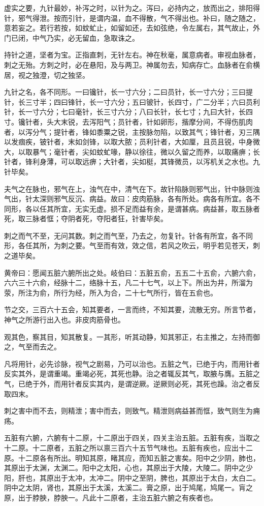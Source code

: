 \documentclass[a4paper,12pt,UTF8,twoside]{ctexbook}
\begin{document}
	虚实之要，九针最妙，补泻之时，以针为之。泻曰，必持内之，放而出之，排阳得针，邪气得泄。按而引针，是谓内温，血不得散，气不得出也。补曰，随之随之，意若妄之。若行若按，如蚊虻止，如留如还，去如弦绝，令左属右，其气故止，外门已闭，中气乃实，必无留血，急取诛之。
	
	持针之道，坚者为宝。正指直刺，无针左右。神在秋毫，属意病者。审视血脉者，刺之无殆。方刺之时，必在悬阳，及与两卫。神属勿去，知病存亡。血脉者在俞横居，视之独澄，切之独坚。
	
	九针之名，各不同形。一曰镵针，长一寸六分；二曰员针，长一寸六分；三曰提针，长三寸半；四曰锋针，长一寸六分；五曰铍针，长四寸，广二分半；六曰员利针，长一寸六分；七曰毫针，长三寸六分；八曰长针，长七寸；九曰大针，长四寸。镵针者，头大末锐，去泻阳气；员针者，针如卵形，揩摩分间，不得伤肌肉者，以泻分气；提针者，锋如黍粟之锐，主按脉勿陷，以致其气；锋针者，刃三隅以发痼疾，铍针者，末如剑锋，以取大脓；员利针者，大如厘，且员且锐，中身微大，以取暴气；毫针者，尖如蚊虻喙，静以徐往，微以久留之而养，以取痛痹；长针者，锋利身薄，可以取远痹；大针者，尖如梃，其锋微员，以泻机关之水也。九针毕矣。
	
	夫气之在脉也，邪气在上，浊气在中，清气在下。故针陷脉则邪气出，针中脉则浊气出，针太深则邪气反沉、病益。故曰：皮肉筋脉，各有所处。病各有所宜。各不同形，各以任其所宜，无实无虚。损不足而益有余，是谓甚病。病益甚，取五脉者死，取三脉者恇；夺阴者死，夺阳者狂，针害毕矣。
	
	刺之而气不至，无问其数。刺之而气至，乃去之，勿复针。针各有所宜，各不同形，各任其所，为刺之要。气至而有效，效之信，若风之吹云，明乎若见苍天，刺之道毕矣。
	
	黄帝曰：愿闻五脏六腑所出之处。岐伯曰：五脏五俞，五五二十五俞，六腑六俞，六六三十六俞，经脉十二，络脉十五，凡二十七气，以上下。所出为井，所溜为荥，所注为俞，所行为经，所入为合，二十七气所行，皆在五俞也。
	
	节之交，三百六十五会，知其要者，一言而终，不知其要，流散无穷。所言节者，神气之所游行出入也。非皮肉筋骨也。
	
	观其色，察其目，知其散复。一其形，听其动静，知其邪正，右主推之，左持而御之，气至而去之。
	
	凡将用针，必先诊脉，视气之剧易，乃可以治也。五脏之气，已绝于内，而用针者反实其外，是谓重竭。重竭必死，其死也静。治之者辄反其气，取腋与膺。五脏之气，已绝于外，而用针者反实其内，是谓逆厥。逆厥则必死，其死也躁。治之者反取四末。
	
	刺之害中而不去，则精泄；害中而去，则致气。精泄则病益甚而恇，致气则生为痈疡。
	
	五脏有六腑，六腑有十二原，十二原出于四关，四关主治五脏。五脏有疾，当取之十二原。十二原者，五脏之所以禀三百六十五节气味也。五脏有疾也，应出十二原。十二原各有所出。明知其原，睹其应，而知五脏之害矣。阳中之少阴，肺也，其原出于太渊，太渊二。阳中之太阳，心也，其原出于大陵，大陵二。阴中之少阳，肝也，其原出于太冲，太冲二。阴中之至阴，脾也，其原出于太白，太白二。阴中之太阴，肾也，其原出于太溪，太溪二。膏之原，出于鸠尾，鸠尾一。肓之原，出于脖胦，脖胦一。凡此十二原者，主治五脏六腑之有疾者也。
	
\end{document}
